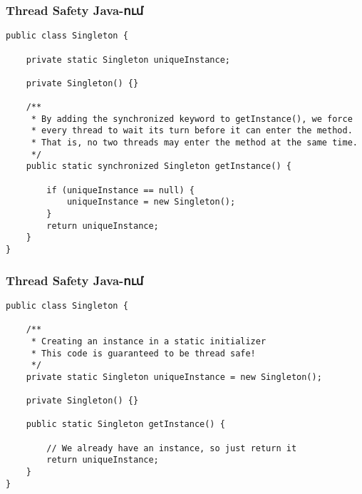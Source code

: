 \documentclass{beamer}
\begin{document}
\begin{frame}[fragile]\frametitle{Thread Safety Java-ում}
\begin{english}
\begin{verbatim}
public class Singleton {

    private static Singleton uniqueInstance;

    private Singleton() {}

    /**
     * By adding the synchronized keyword to getInstance(), we force
     * every thread to wait its turn before it can enter the method.
     * That is, no two threads may enter the method at the same time.
     */
    public static synchronized Singleton getInstance() {

        if (uniqueInstance == null) {
            uniqueInstance = new Singleton();
        }
        return uniqueInstance;
    }
}
\end{verbatim}
\end{english}
\end{frame}

\begin{frame}[fragile]\frametitle{Thread Safety Java-ում}
\begin{english}
\begin{verbatim}
public class Singleton {

    /**
     * Creating an instance in a static initializer
     * This code is guaranteed to be thread safe!
     */
    private static Singleton uniqueInstance = new Singleton();

    private Singleton() {}

    public static Singleton getInstance() {

        // We already have an instance, so just return it
        return uniqueInstance;
    }
}
\end{verbatim}
\end{english}
\end{frame}
\end{document}
